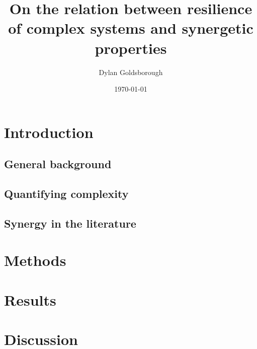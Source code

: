 \documentclass{article}
\title{On the relation between resilience of complex systems and synergetic properties}
\author{Dylan Goldsborough}
\date{\today}
\providecommand{\main}{.}
\def\biblio{}
\begin{document}
\def\biblio{}

\maketitle



\section{Introduction}

\subsection{General background}



\subsection{Quantifying complexity}



\subsection{Synergy in the literature}



\section{Methods}



\section{Results}



\section{Discussion}





\end{document}
